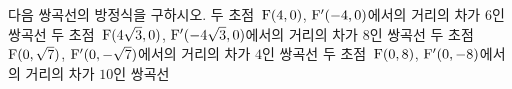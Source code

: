 다음 쌍곡선의 방정식을 구하시오.
 두 초점~$\mathrm{F}(4{,}\mkern3mu\mathopen{}0)$, $\mathrm{F}'(-4{,}\mkern3mu\mathopen{}0)$에서의 거리의 차가 $6$인 쌍곡선
 두 초점~$\mathrm{F}(4\sqrt{3}{,}\mkern3mu\mathopen{}0)$, $\mathrm{F}'(-4\sqrt{3}{,}\mkern3mu\mathopen{}0)$에서의 거리의 차가 $8$인 쌍곡선
 두 초점~$\mathrm{F}(0{,}\mkern3mu\mathopen{}\sqrt{7})$, $\mathrm{F}'(0{,}\mkern3mu\mathopen{}-\sqrt{7})$에서의 거리의 차가 $4$인 쌍곡선
 두 초점~$\mathrm{F}(0{,}\mkern3mu\mathopen{}8)$, $\mathrm{F}'(0{,}\mkern3mu\mathopen{}-8)$에서의 거리의 차가 $10$인 쌍곡선
